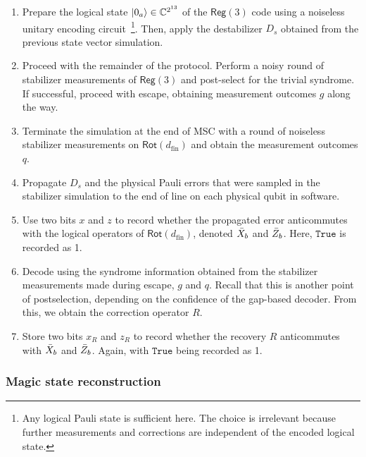 \documentclass[%
    aps, 
    physrev,
    reprint,
]{revtex4-2}
\newcommand{\rot}[1]{\mathsf{Rot}(#1)}
\newcommand{\reg}[1]{\mathsf{Reg}(#1)}
\newcommand{\fin}{_\mathrm{fin}}
\begin{document}
\begin{enumerate}

    \item 
    Prepare the logical state $\ket{0_a}\in\mathbb{C}^{2^{13}}$ of the $\reg3$ code using a noiseless unitary encoding circuit~\footnote{Any logical Pauli state is sufficient here. The choice is irrelevant because further measurements and corrections are independent of the encoded logical state.}. 
    Then, apply the destabilizer $D_s$ obtained from the previous state vector simulation.
    
    \item 
    Proceed with the remainder of the protocol.
    Perform a noisy round of stabilizer measurements of $\reg3$ and post-select for the trivial syndrome.
    If successful, proceed with escape, obtaining measurement outcomes $g$ along the way.
    
    \item 
    Terminate the simulation at the end of MSC with a round of noiseless stabilizer measurements on $\rot{d\fin}$ and obtain the measurement outcomes $q$.
    
    \item 
    Propagate $D_s$ and the physical Pauli errors that were sampled in the stabilizer simulation to the end of line on each physical qubit in software. 

    \item 
    Use two bits $x$ and $z$ to record whether the propagated error anticommutes with the logical operators of $\rot{d\fin}$, denoted $\bar{X}_b$ and $\bar{Z}_b$.
    Here, $\mathtt{True}$ is recorded as 1.
    

    \item 
    Decode using the syndrome information obtained from the stabilizer measurements made during escape, $g$ and $q$.
    Recall that this is another point of postselection, depending on the confidence of the gap-based decoder.
    From this, we obtain the correction operator $R$.
    
    \item 
    Store two bits $x_R$ and $z_R$ to record whether the recovery $R$ anticommutes with $\bar{X}_b$ and $\bar{Z}_b$.
    Again, with $\mathtt{True}$ being recorded as 1.
    
\end{enumerate}
    
\subsubsection{Magic state reconstruction}
\end{document}
